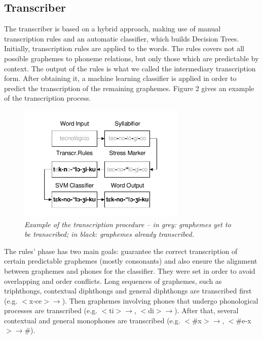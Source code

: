 \subsection{Transcriber}
The transcriber is based on a hybrid approach, making use of manual transcription rules and an automatic classifier, 
which builds Decision Trees. Initially, transcription rules are applied to the words. 
The rules covers not all possible graphemes
to phoneme relations, but only those which are predictable by context. The output of the rules is what we called the 
intermediary transcription form. After obtaining it, a machine learning classifier is applied in order to
predict the transcription of the remaining graphemes. Figure 2 gives an example of the transcription process.

\begin{figure}[!ht]
\centerline{ \includegraphics[width=8cm]{./gfx/aeiouado-transcript-ex.pdf}}
\caption{{\it Example of the transcription procedure -- in grey: graphemes yet to be transcribed; in black: graphemes already transcribed.}}
\label{transcExample}
\end{figure}

The rules' phase has two main goals: guarantee the correct transcription of certain predictable graphemes (mostly consonants)
and also ensure the alignment between graphemes and phones for the classifier. They were set in order to avoid
overlapping and order conflicts. Long sequences of graphemes, such as triphthongs, contextual diphthongs and general 
diphthongs are transcribed first (e.g.  $<$x-ce$> \rightarrow $\textipa{[-se]}). 
Then graphemes involving phones that undergo phonological processes are transcribed (e.g. $<$ti$> \rightarrow $\textipa{[tSi]},
$<$di$> \rightarrow $\textipa{[dZi]}). After that, several contextual and general monophones are transcribed 
(e.g. $<$\#x$> \rightarrow $\textipa{[S]}, $<$\#e-x$> \rightarrow $\textipa{[}\#\textipa{e-z]}). 

